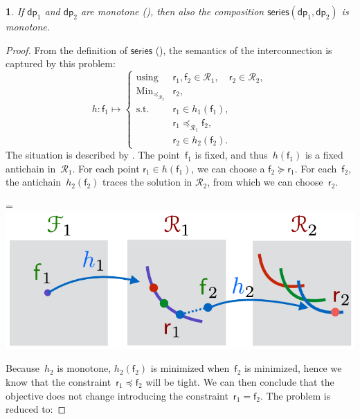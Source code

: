 \documentclass[twocolumn,english]{IEEEtran}
\theoremstyle{definition}
\theoremstyle{plain}
\theoremstyle{definition}
\theoremstyle{remark}
\theoremstyle{definition}
\theoremstyle{plain}
\newtheorem{prop}{\protect\propositionname}
\theoremstyle{plain}
\newcommand{\aword}[1]{\mathsf{#1}}
\newcommand{\vmath}[1]{\aword{#1}}
\newcommand{\subto}{\text{s.t.}}
\newcommand{\with}{\text{using}}
\DeclareMathOperator*{\Min}{Min}
\newcommand{\posleq}{\preceq}
\newcommand{\posgeq}{\succeq}
\newcommand{\ftor}{{h}}
\newcommand{\fun}{\vmath{f}}
\newcommand{\res}{\vmath{r}}
\newcommand{\ressp}{\mathscr{R}}
\newcommand{\dprob}{\vmath{dp}}
\newcommand{\dpseries}{\vmath{series}}
\newcommand*{\vcenteredhbox}[1]{\begingroup
\setbox0=\hbox{#1}\parbox{\wd0}{\box0}\endgroup}
\newcommand{\captionsideleft}[2]{
    \medskip
    \begin{minipage}{1.8cm}{
        \hfill
        \protect\captionof{figure}{#1}}\end{minipage}
    \begin{minipage}{6.6cm}
    
    \vcenteredhbox{{#2}}
    \hfill
    \end{minipage}
    \medskip
}
\providecommand{\propositionname}{Proposition}
\begin{document}
\begin{prop}
\label{pro:series-monotone}If $\dprob_{1}$ and $\dprob_{2}$ are
monotone (), then also the composition $\dpseries(\dprob_{1},\dprob_{2})$
is monotone.
\end{prop}
\begin{proof}
From the definition of $\dpseries$ (),
the semantics of the interconnection is captured by this problem:
\begin{equation}
\ftor:\fun_{1}\mapsto\begin{cases}
\with & \res_{1},\fun_{2}\in\ressp_{1},\quad\res_{2}\in\ressp_{2},\\
\Min_{\posleq_{\ressp_{2}}} & \res_{2},\\
\subto & \res_{1}\in\ftor_{1}(\fun_{1}),\\
 & \res_{1}\posleq_{\ressp_{1}}\fun_{2},\\
 & \res_{2}\in\ftor_{2}(\fun_{2}).
\end{cases}\label{eq:dede}
\end{equation}
The situation is described by . The point~$\fun_{1}$
is fixed, and thus~$\ftor(\fun_{1})$ is a fixed antichain in~$\ressp_{1}$.
For each point $\res_{1}\in\ftor(\fun_{1})$, we can choose a $\fun_{2}\posgeq\res_{1}$.
For each~$\fun_{2}$, the antichain~$\ftor_{2}(\fun_{2})$ traces
the solution in $\ressp_{2}$, from which we can choose~$\res_{2}$. 

\captionsideleft{\label{fig:series_mono1-2}}{\includegraphics[scale=0.45]{gmcdp_monotone_proof_mono1}}

\noindent Because~$\ftor_{2}$ is monotone, $\ftor_{2}(\fun_{2})$
is minimized when~$\fun_{2}$ is minimized, hence we know that the
constraint~$\res_{1}\posleq\fun_{2}$ will be tight. We can then
conclude that the objective does not change introducing the constraint~$\res_{1}=\fun_{2}$.
The problem is reduced to:


\end{proof}
\end{document}
